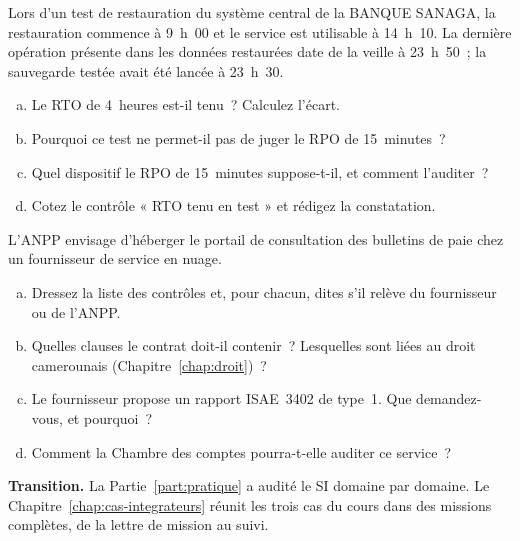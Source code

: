 \begin{boxexo}[title={\ding{45}\quad Exercice~17.2. RTO et RPO \niveaumoyen}]
Lors d'un test de restauration du système central de la BANQUE SANAGA, la
restauration commence à 9~h~00 et le service est utilisable à 14~h~10. La
dernière opération présente dans les données restaurées date de la veille
à 23~h~50~; la sauvegarde testée avait été lancée à 23~h~30.
\begin{enumerate}[(a)]
    \item Le RTO de 4~heures est-il tenu~? Calculez l'écart.
    \item Pourquoi ce test ne permet-il pas de juger le RPO de
          15~minutes~?
    \item Quel dispositif le RPO de 15~minutes suppose-t-il, et comment
          l'auditer~?
    \item Cotez le contrôle « RTO tenu en test » et rédigez la
          constatation.
\end{enumerate}
\end{boxexo}

\begin{boxexo}[title={\ding{45}\quad Exercice~17.3. Un service en nuage pour l'ANPP \niveauexpert}]
L'ANPP envisage d'héberger le portail de consultation des bulletins de
paie chez un fournisseur de service en nuage.
\begin{enumerate}[(a)]
    \item Dressez la liste des contrôles et, pour chacun, dites s'il
          relève du fournisseur ou de l'ANPP.
    \item Quelles clauses le contrat doit-il contenir~? Lesquelles sont
          liées au droit camerounais (Chapitre~\ref{chap:droit})~?
    \item Le fournisseur propose un rapport ISAE~3402 de type~1. Que
          demandez-vous, et pourquoi~?
    \item Comment la Chambre des comptes pourra-t-elle auditer ce service~?
\end{enumerate}
\end{boxexo}

\bigskip

\begin{boxinfo}
\textbf{Transition.} La Partie~\ref{part:pratique} a audité le SI domaine
par domaine. Le Chapitre~\ref{chap:cas-integrateurs} réunit les trois cas
du cours dans des missions complètes, de la lettre de mission au suivi.
\end{boxinfo}
